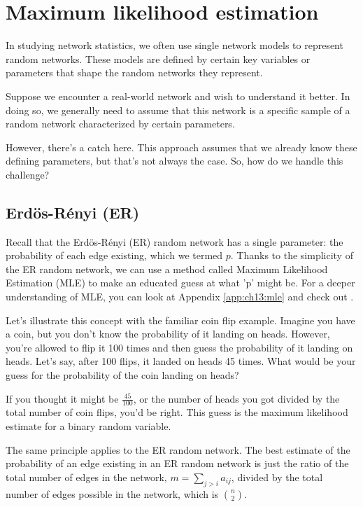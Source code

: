 \section{Maximum likelihood estimation}
\label{sec:ch6:mle}

In studying network statistics, we often use single network models to represent random networks. These models are defined by certain key variables or parameters that shape the random networks they represent.

Suppose we encounter a real-world network and wish to understand it better. In doing so, we generally need to assume that this network is a specific sample of a random network characterized by certain parameters.

However, there's a catch here. This approach assumes that we already know these defining parameters, but that's not always the case. So, how do we handle this challenge?


\subsection{Erd\"os-R\'enyi (ER)}

Recall that the Erd\"os-R\'enyi (ER) random network has a single parameter: the probability of each edge existing, which we termed $p$. Thanks to the simplicity of the ER random network, we can use a method called Maximum Likelihood Estimation (MLE) to make an educated guess at what 'p' might be. For a deeper understanding of MLE, you can look at Appendix \ref{app:ch13:mle} and check out \cite{Casella2001Jun}.

Let's illustrate this concept with the familiar coin flip example.  Imagine you have a coin, but you don't know the probability of it landing on heads.  However, you're allowed to flip it 100 times and then guess the probability of it landing on heads. Let's say, after 100 flips, it landed on heads 45 times. What would be your guess for the probability of the coin landing on heads?

If you thought it might be $\frac{45}{100}$, or the number of heads you got divided by the total number of coin flips, you'd be right. This guess is the maximum likelihood estimate for a binary random variable.

The same principle applies to the ER random network. The best estimate of the probability of an edge existing in an ER random network is just the ratio of the total number of edges in the network, $m = \sum_{j > i}a_{ij}$, divided by the total number of edges possible in the network, which is $\binom n 2$.

